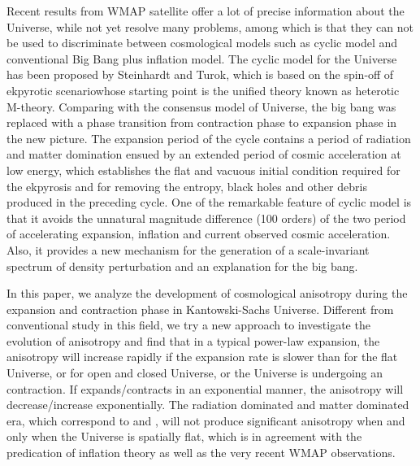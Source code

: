 \documentclass[a4paper,preprint]{revtex4}
\begin{document}
Recent results from WMAP satellite offer a lot of precise
information about the Universe\cite{wmap}, while not yet resolve
many problems, among which is that they can not be used to
discriminate between cosmological models such as cyclic model and
conventional Big Bang plus inflation model\cite{stscience}. The
cyclic model for the Universe has been proposed by Steinhardt and
Turok\cite{steinhardt1}, which is based on the spin-off of
ekpyrotic scenario\cite{steinhardt2}whose starting point is the
unified theory known as heterotic M-theory\cite{witten}. Comparing
with the consensus model of Universe, the big bang was replaced
with a phase transition from contraction phase to expansion phase
in the new picture. The expansion period of the cycle contains a
period of radiation and matter domination ensued by an extended
period of cosmic acceleration at low energy, which establishes the
flat and vacuous initial condition required for the ekpyrosis and
for removing the entropy, black holes and other debris produced in
the preceding cycle. One of the remarkable feature of cyclic model
is that it avoids the unnatural magnitude difference (100 orders)
of the two period of accelerating expansion, inflation and current
observed cosmic acceleration. Also, it provides a new mechanism
for the generation of a scale-invariant spectrum of density
perturbation and an explanation for the big bang.

In this paper, we analyze the development of cosmological
anisotropy during the expansion and contraction phase in
Kantowski-Sachs Universe. Different from conventional study in
this field\cite{kantowski}, we try a new approach to investigate
the evolution of anisotropy and find that in a typical power-law
expansion, the anisotropy will increase rapidly if the expansion
rate \coordHE{} is slower than \coordHE{} for the flat
Universe, or \coordHE{} for open and closed Universe, or the
Universe is undergoing an contraction. If \coordHE{} expands/contracts
in an exponential manner, the anisotropy will decrease/increase
exponentially. The radiation dominated and matter dominated era,
which correspond to \coordHE{} and \coordHE{}, will not produce significant anisotropy when and
only when the Universe is spatially flat, which is in agreement
with the predication of inflation theory\cite{inflation} as well
as the very recent WMAP observations\cite{stscience}.
\end{document}
